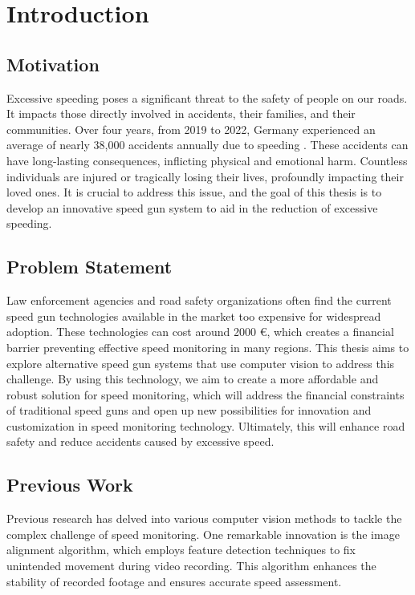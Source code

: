 \chapter{Introduction}

\section{Motivation}

Excessive speeding poses a significant threat to the safety of people on our roads. It impacts those directly involved in accidents, their families, and their communities. Over four years, from 2019 to 2022, Germany experienced an average of nearly 38,000 accidents annually due to speeding \cite{Statis_2023b}. These accidents can have long-lasting consequences, inflicting physical and emotional harm. Countless individuals are injured or tragically losing their lives, profoundly impacting their loved ones. It is crucial to address this issue, and the goal of this thesis is to develop an innovative speed gun system to aid in the reduction of excessive speeding.

\section{Problem Statement}
Law enforcement agencies and road safety organizations often find the current speed gun technologies available in the market too expensive for widespread adoption. These technologies can cost around 2000 €, which creates a financial barrier preventing effective speed monitoring in many regions. This thesis aims to explore alternative speed gun systems that use computer vision to address this challenge. By using this technology, we aim to create a more affordable and robust solution for speed monitoring, which will address the financial constraints of traditional speed guns and open up new possibilities for innovation and customization in speed monitoring technology. Ultimately, this will enhance road safety and reduce accidents caused by excessive speed.

\section{Previous Work}
Previous research \cite{Sabtu_2023} has delved into various computer vision methods to tackle the complex challenge of speed monitoring. One remarkable innovation is the image alignment algorithm, which employs feature detection techniques to fix unintended movement during video recording. This algorithm enhances the stability of recorded footage and ensures accurate speed assessment.

